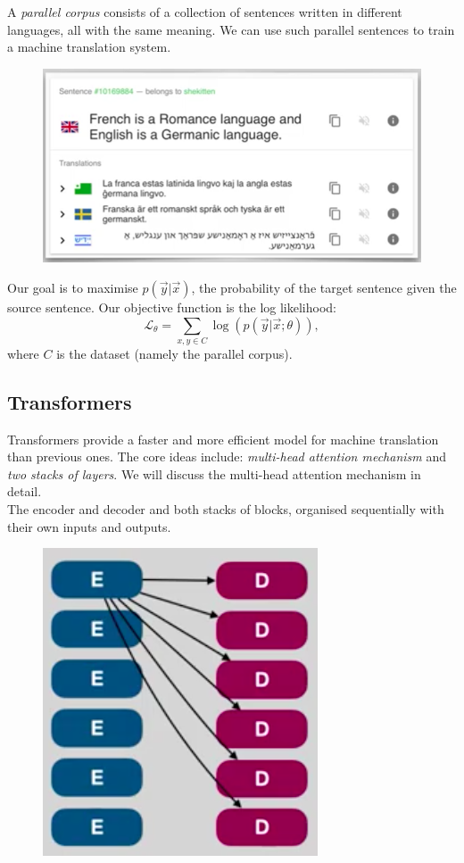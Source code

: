 A \textit{parallel corpus} consists of a collection of sentences written in different languages, all with the same meaning. We can use such parallel sentences to train a machine translation system. 
\begin{figure}[H]
\centering
\includegraphics[scale=0.4]{parallelcorpus.png}
\end{figure}

Our goal is to maximise $p(\vec{y} | \vec{x})$, the probability of the target sentence given the source sentence. Our objective function is the log likelihood:
\begin{equation*}
\mathcal{L}_{\theta} = \sum_{x,y \in C} \log(p(\vec{y} | \vec{x}; \theta)),
\end{equation*}
where $C$ is the dataset (namely the parallel corpus). 



\minirule

\subsection{Transformers}
Transformers provide a faster and more efficient model for machine translation than previous ones. The core ideas include: \textit{multi-head attention mechanism} and \textit{two stacks of layers}. We will discuss the multi-head attention mechanism in detail.\\

The encoder and decoder and both stacks of blocks, organised sequentially with their own inputs and outputs. 
\begin{figure}[H]
\centering
\includegraphics[scale=0.4]{stackencoder.png}
\end{figure}

